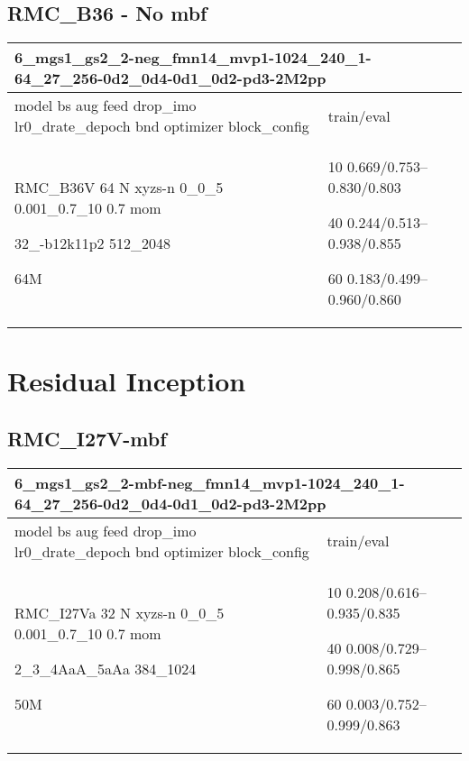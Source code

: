 \documentclass[,table,dvipsnames]{article}
\begin{document}
\subsection{RMC\_B36 - No mbf}
\noindent\begin{tabular}{|p{10cm}|p{5cm}| }	
	\hline
	\multicolumn{2}{|p{15cm}|}{ 6\_mgs1\_gs2\_2-neg\_fmn14\_mvp1-1024\_240\_1-64\_27\_256-0d2\_0d4-0d1\_0d2-pd3-2M2pp }\\
	\hline
	model bs aug feed drop\_imo lr0\_drate\_depoch bnd optimizer block\_config & train/eval \\
	
	\rowcolor{red!20}
	RMC\_B36V 64 N xyzs-n 0\_0\_5 0.001\_0.7\_10 0.7 mom\par 32\_-b12k11p2 512\_2048\par 64M&10 0.669/0.753--0.830/0.803\par40 0.244/0.513--0.938/0.855\par 60 0.183/0.499--0.960/0.860\\
	
	\hline 
\end{tabular}

\section{Residual Inception}
\subsection{RMC\_I27V-mbf}
\noindent\begin{tabular}{|p{10cm}|p{5cm}| }	
	\hline
	\multicolumn{2}{|p{15cm}|}{ 6\_mgs1\_gs2\_2-mbf-neg\_fmn14\_mvp1-1024\_240\_1-64\_27\_256-0d2\_0d4-0d1\_0d2-pd3-2M2pp }\\
	\hline
	model bs aug feed drop\_imo lr0\_drate\_depoch bnd optimizer block\_config & train/eval \\
	
	\rowcolor{red!20}
	RMC\_I27Va 32 N xyzs-n 0\_0\_5 0.001\_0.7\_10 0.7 mom\par 2\_3\_4AaA\_5aAa 384\_1024\par 50M& 
	10 0.208/0.616--0.935/0.835\par 40 0.008/0.729--0.998/0.865\par 60 0.003/0.752--0.999/0.863\\
	
	
	\hline 
\end{tabular}
\end{document}
